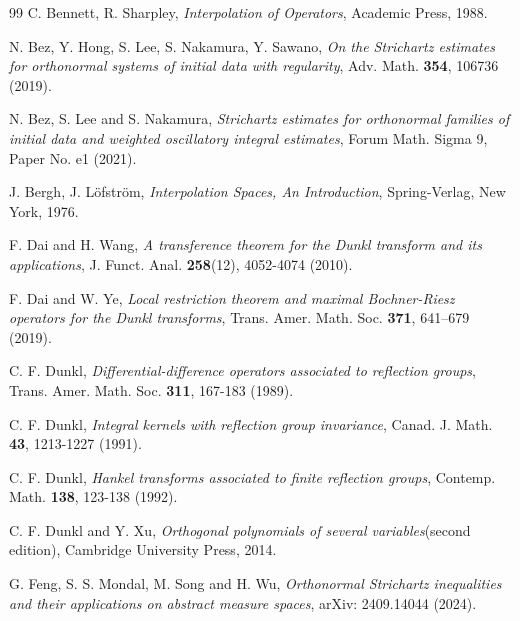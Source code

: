\documentclass[a4paper,11pt, reqno]{amsart}
\numberwithin{equation}{section}
\theoremstyle{plain}
\theoremstyle{definition}
\theoremstyle{remark}
\begin{document}
	\begin{thebibliography}{99}
		\normalsize
		\baselineskip=17pt
\label{Bennet} C. Bennett, R. Sharpley, \emph{Interpolation of Operators}, Academic Press, 1988.

\label{Bez-Hong-Lee-Nakamura-Sawano} N. Bez, Y. Hong, S. Lee, S. Nakamura, Y. Sawano, \emph{On the Strichartz estimates for orthonormal systems of initial data with regularity}, Adv. Math. \textbf{354}, 106736 (2019).

\label{BEZ} N.  Bez, S.  Lee and S.  Nakamura,  \emph{Strichartz estimates for orthonormal families of initial data and weighted oscillatory integral estimates},  Forum Math. Sigma 9, Paper No. e1  (2021).

\label{Bergh-Lofstrom} J. Bergh, J. L\"{o}fstr\"{o}m, \emph{Interpolation Spaces, An Introduction}, Spring-Verlag, New York, 1976.


\label{Dai-Wang} F. Dai and H. Wang, \emph{A transference theorem for the Dunkl transform and its applications}, J. Funct. Anal. \textbf{258}(12), 4052-4074 (2010).

\label{Dai-Ye} F. Dai and W. Ye, \emph{Local restriction theorem and maximal Bochner-Riesz operators for the Dunkl transforms}, Trans. Amer. Math. Soc. \textbf{371}, 641–679 (2019).

\label{dun} C. F. Dunkl, \emph{Differential-difference operators associated to reflection groups}, Trans. Amer. Math. Soc. \textbf{311}, 167-183 (1989).
		
 C. F. Dunkl, \emph{Integral kernels with reflection group invariance}, Canad. J. Math. \textbf{43}, 1213-1227 (1991).
				
 	C. F. Dunkl, \emph{Hankel transforms associated to finite reflection groups}, Contemp. Math. \textbf{138}, 123-138 (1992).

  C. F. Dunkl and  Y. Xu, \emph{Orthogonal polynomials of several variables}(second edition), Cambridge
University Press, 2014.

\label{FMSW} G. Feng, S. S. Mondal, M. Song and H. Wu, \emph{Orthonormal Strichartz inequalities and their applications on abstract measure spaces}, arXiv: 2409.14044 (2024).


\end{thebibliography}
\end{document}
